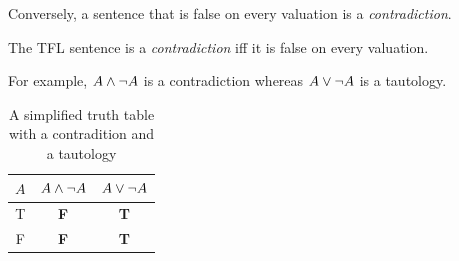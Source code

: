\begin{table}[h]

  \label{tab:tt-neg-equivalences}
  \caption{Simplified truth tables demonstrating \textbf{LEM}, \textbf{LNC}, and \textbf{DN}}
\end{table}

Conversely, a sentence that is false on every valuation is a
\emph{contradiction}.

\begin{definition}[Contradiction]
  \label{def:tfl-contradiction}
  The TFL sentence \sphi is a \emph{contradiction} iff it is false on every
  valuation.
\end{definition}

For example, $A\wedge\neg A$ is a contradiction whereas $A\vee\neg A$ is a
tautology.

\begin{table}[h]
  \begin{center}
    \begin{tabular}{c||c|c}
      $A$ & $A \wedge \neg A$ & $A \vee \neg A$ \\
      \hline
      T & \textbf{F} & \textbf{T} \\
      F & \textbf{F} & \textbf{T}
    \end{tabular}
  \end{center}
  \label{tab:truth-table-example}
  \caption{A simplified truth table with a contradition and a tautology}
\end{table}

